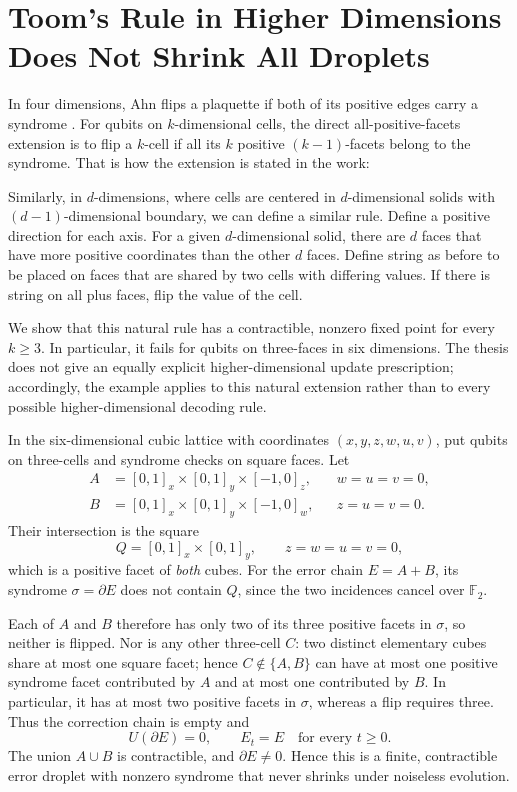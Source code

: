 \documentclass[manuscript,screen,review]{acmart}
\begin{document}
\section{Toom's Rule in Higher Dimensions Does Not Shrink All Droplets}


In four dimensions, Ahn flips a plaquette if both of its positive edges carry a syndrome \cite[p.~105]{Ahn2004}. For qubits on $k$-dimensional cells, the direct all-positive-facets extension is to flip a $k$-cell if all its $k$ positive $(k-1)$-facets belong to the syndrome. That is how the extension is stated in the work:

\begin{framed}
  Similarly, in $d$-dimensions, where cells are centered in $d$-dimensional solids with $(d-1)$-dimensional boundary, we can define a similar rule. Define a positive direction for each axis. For a given $d$-dimensional solid, there are $d$ faces that have more positive coordinates than the other $d$ faces. Define string as before to be placed on faces that are shared by two cells with differing values. If there is string on all plus faces, flip the value of the cell. 
\end{framed}


We show that this natural rule has a contractible, nonzero fixed
point for every $k\ge3$. In particular, it fails for qubits on
three-faces in six dimensions. The thesis does not give an equally
explicit higher-dimensional update prescription; accordingly, the
example applies to this natural extension rather than to every
possible higher-dimensional decoding rule.

In the six-dimensional cubic lattice with coordinates
$(x,y,z,w,u,v)$, put qubits on three-cells and syndrome checks on
square faces. Let
\begin{align}
 A&=[0,1]_x\times[0,1]_y\times[-1,0]_z,
   &&w=u=v=0,\\
 B&=[0,1]_x\times[0,1]_y\times[-1,0]_w,
   &&z=u=v=0.
\end{align}
Their intersection is the square
\begin{equation}
 Q=[0,1]_x\times[0,1]_y,
 \qquad z=w=u=v=0,
\end{equation}
which is a positive facet of \emph{both} cubes. For the error chain
$E=A+B$, its syndrome $\sigma=\partial E$ does not contain $Q$,
since the two incidences cancel over $\mathbb F_2$.

Each of $A$ and $B$ therefore has only two of its three positive
facets in $\sigma$, so neither is flipped. Nor is any other
three-cell $C$: two distinct elementary cubes share at most one
square facet; hence $C\notin\{A,B\}$ can have at most one positive
syndrome facet contributed by $A$ and at most one contributed by
$B$. In particular, it has at most two positive facets in
$\sigma$, whereas a flip requires three. Thus the correction
chain is empty and
\begin{equation}\label{eq:fixed-six-dimensional-droplet}
 U(\partial E)=0,\qquad E_t=E\quad\text{for every }t\ge0.
\end{equation}
The union $A\cup B$ is contractible, and $\partial E\ne0$. Hence
this is a finite, contractible error droplet with nonzero syndrome
that never shrinks under noiseless evolution.
\end{document}
